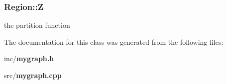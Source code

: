 \subsubsection{ {\bf Region::Z}}\label{classRegion_ea3091ba12ef97052e61d7b506e072b3}


the partition function 



The documentation for this class was generated from the following files:\begin{CompactItemize}
\item 
inc/{\bf mygraph.h}\item 
src/{\bf mygraph.cpp}\end{CompactItemize}
